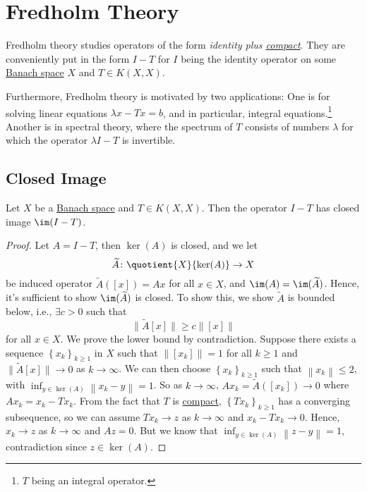 \section{Fredholm Theory}
Fredholm theory studies operators of the form \emph{identity plus \hyperref[def:compact-op]{compact}}. They are conveniently put in the form \(I - T\) for \(I\) being the identity operator on some \hyperref[def:Banach-space]{Banach space} \(X\) and \(T\in K(X, X)\).

Furthermore, Fredholm theory is motivated by two applications: One is for solving linear equations \(\lambda x - Tx = b\), and in particular, integral equations.\footnote{\(T\) being an integral operator.} Another is in spectral theory, where the spectrum of \(T\) consists of numbers \(\lambda \) for which the operator \(\lambda I - T\) is invertible.
\subsection{Closed Image}
\begin{lemma}\label{lma:lec19}
	Let \(X\) be a \hyperref[def:Banach-space]{Banach space} and \(T\in K(X, X)\). Then the operator \(I-T\) has closed image \(\im(I-T)\).
\end{lemma}
\begin{proof}
	Let \(A=I-T\), then \(\ker (A)\) is closed, and we let
	\[
		\widetilde{A} \colon \quotient{X}{\ker(A)}\to X
	\]
	be induced operator \(\widetilde{A} ([x])=Ax\) for all \(x\in X\), and \(\im(A) = \im(\widetilde{A} )\). Hence, it's sufficient to show \(\im(\widetilde{A} )\) is closed. To show this, we show \(\widetilde{A} \) is bounded below, i.e., \(\exists c>0\) such that
	\[
		\lVert \widetilde{A} [x]\rVert \geq c\left\lVert [x]\right\rVert
	\]
	for all \(x\in X\). We prove the lower bound by contradiction. Suppose there exists a sequence \(\left\{ x_k \right\} _{k\geq 1}\) in \(X\) such that \(\left\lVert [x_{k} ]\right\rVert = 1\) for all \(k\geq 1\) and \(\lVert \widetilde{A} [x] \rVert \to 0\) as \(k \to \infty \). We can then choose \(\left\{ x_{k}  \right\}_{k\geq 1} \) such that \(\left\lVert x_{k} \right\rVert \leq 2\), with \(\inf_{y\in \ker(A)} \left\lVert x_{k} -y\right\rVert=1 \). So as \(k\to \infty \), \(Ax_{k} = \widetilde{A} ([x_{k} ])\to 0\) where \(Ax_{k} = x_{k} - Tx_{k} \). From the fact that \(T\) is \hyperref[def:compact-op]{compact}, \(\left\{ Tx_{k}  \right\}_{k\geq 1} \) has a converging subsequence, so we can assume \(Tx_{k} \to z\) as \(k\to \infty \) and \(x_{k} - Tx_{k} \to 0\). Hence, \(x_{k} \to z\) as \(k\to  \infty \) and \(Az = 0\). But we know that \(\inf _{y\in \ker(A)} \left\lVert z - y\right\rVert = 1\), contradiction since \(z\in \ker(A)\).
\end{proof}


